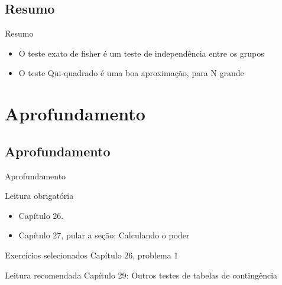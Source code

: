\documentclass{beamer}
\begin{document}
\subsection{Resumo}

\begin{frame}{Resumo}
  \begin{itemize}
  \item O teste exato de fisher é um teste de independência entre os grupos
  \item O teste Qui-quadrado é uma boa aproximação, para N grande
  \end{itemize}
\end{frame}

\section{Aprofundamento}

\subsection{Aprofundamento}

\begin{frame}{Aprofundamento}
  \begin{block}{Leitura obrigatória}
    \begin{itemize}
      \small
    \item Capítulo 26.
    \item Capítulo 27, pular a seção: Calculando o poder
    \end{itemize}
  \end{block}
  \begin{block}{Exercícios selecionados}
    \footnotesize
    Capítulo 26, problema 1
  \end{block}
  \begin{block}{Leitura recomendada}
    \small
    Capítulo 29: Outros testes de tabelas de contingência
  \end{block}
\end{frame}
\end{document}
